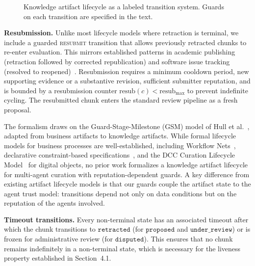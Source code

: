 \documentclass[11pt]{article}
\begin{document}
\begin{figure}[ht]
\caption{Knowledge artifact lifecycle as a labeled transition system. Guards on each transition are specified in the text.}
\label{fig:lifecycle}
\end{figure}

\textbf{Resubmission.} Unlike most lifecycle models where retraction is terminal, we include a guarded \textsc{resubmit} transition that allows previously retracted chunks to re-enter evaluation. This mirrors established patterns in academic publishing (retraction followed by corrected republication) and software issue tracking (resolved to reopened)~\cite{conradi1998}. Resubmission requires a minimum cooldown period, new supporting evidence or a substantive revision, sufficient submitter reputation, and is bounded by a resubmission counter $\text{resub}(c) < \text{resub}_{\max}$ to prevent indefinite cycling. The resubmitted chunk enters the standard review pipeline as a fresh proposal.

The formalism draws on the Guard-Stage-Milestone (GSM) model of Hull et al.~\cite{hull2011}, adapted from business artifacts to knowledge artifacts. While formal lifecycle models for business processes are well-established, including Workflow Nets~\cite{vanderaalst1998}, declarative constraint-based specifications~\cite{pesic2007}, and the DCC Curation Lifecycle Model~\cite{higgins2008} for digital objects, no prior work formalizes a knowledge artifact lifecycle for multi-agent curation with reputation-dependent guards. A key difference from existing artifact lifecycle models is that our guards couple the artifact state to the agent trust model: transitions depend not only on data conditions but on the reputation of the agents involved.

\textbf{Timeout transitions.} Every non-terminal state has an associated timeout after which the chunk transitions to $\texttt{retracted}$ (for $\texttt{proposed}$ and $\texttt{under\_review}$) or is frozen for administrative review (for $\texttt{disputed}$). This ensures that no chunk remains indefinitely in a non-terminal state, which is necessary for the liveness property established in Section~4.1.
\end{document}
